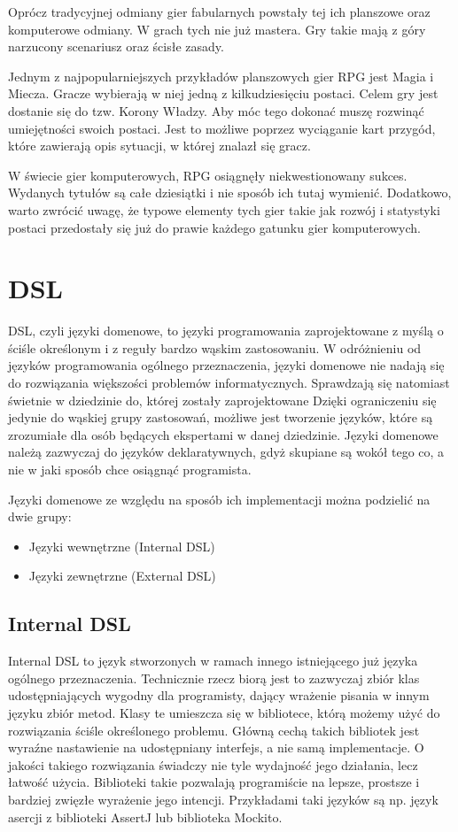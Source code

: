 \documentclass	{xmgr}
\begin{document}
Oprócz tradycyjnej odmiany gier fabularnych powstały tej ich planszowe oraz komputerowe odmiany. W grach tych nie już mastera. Gry takie mają z góry narzucony scenariusz oraz ścisłe zasady. 

Jednym z najpopularniejszych przykładów planszowych gier RPG jest Magia i Miecza. Gracze wybierają w niej jedną z kilkudziesięciu postaci. Celem gry jest dostanie się do tzw. Korony Władzy. Aby móc tego dokonać muszę rozwinąć umiejętności swoich postaci. Jest to możliwe poprzez wyciąganie kart przygód, które zawierają opis sytuacji, w której znalazł się gracz. 

W świecie gier komputerowych, RPG osiągnęły niekwestionowany sukces. Wydanych tytułów są całe dziesiątki i nie sposób ich tutaj wymienić. Dodatkowo, warto zwrócić uwagę, że typowe elementy tych gier takie jak rozwój i statystyki postaci przedostały się już do prawie każdego gatunku gier komputerowych.

\section{DSL}

DSL, czyli języki domenowe, to języki programowania zaprojektowane z myślą o ściśle określonym i z reguły bardzo wąskim zastosowaniu. W odróżnieniu od języków programowania ogólnego przeznaczenia, języki domenowe nie nadają się do rozwiązania większości problemów informatycznych. Sprawdzają się natomiast świetnie w dziedzinie do, której zostały zaprojektowane Dzięki ograniczeniu się jedynie do wąskiej grupy zastosowań, możliwe jest tworzenie języków, które są zrozumiałe dla osób będących ekspertami w danej dziedzinie. Języki domenowe należą zazwyczaj do języków deklaratywnych, gdyż skupiane są wokół tego co, a nie w jaki sposób chce osiągnąć programista.

Języki domenowe ze względu na sposób ich implementacji można podzielić na dwie grupy:
\begin{itemize}
\item Języki wewnętrzne (Internal DSL)
\item Języki zewnętrzne (External DSL)
\end{itemize}

\subsection{Internal DSL}

Internal DSL to język stworzonych w ramach innego istniejącego już języka ogólnego przeznaczenia. Technicznie rzecz biorą jest to zazwyczaj zbiór klas udostępniających wygodny dla programisty, dający wrażenie pisania w innym języku zbiór metod. Klasy te umieszcza się w bibliotece, którą możemy użyć do rozwiązania ściśle określonego problemu. Główną cechą takich bibliotek jest wyraźne nastawienie na udostępniany interfejs, a nie samą implementacje. O jakości takiego rozwiązania świadczy nie tyle wydajność jego działania, lecz łatwość użycia. Biblioteki takie pozwalają programiście na lepsze, prostsze i bardziej zwięzłe wyrażenie jego intencji. Przykładami taki języków są np. język asercji z biblioteki AssertJ lub  biblioteka Mockito. 
\end{document}
